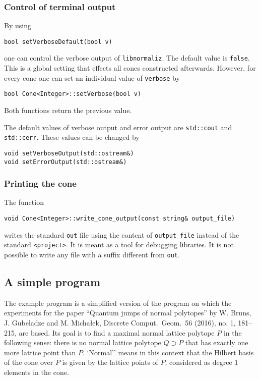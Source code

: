 \documentclass[12pt,a4paper]{scrartcl}
\theoremstyle{definition}
\begin{document}
\begin{small}
\subsubsection{Control of terminal output}
By using
\begin{Verbatim}
bool setVerboseDefault(bool v)
\end{Verbatim}
one can control the verbose output of \verb|libnormaliz|. The default value is \verb|false|. This is a global setting that effects all cones constructed afterwards. However, for every cone one can set an individual value of \verb|verbose| by
\begin{Verbatim}
bool Cone<Integer>::setVerbose(bool v)
\end{Verbatim}
Both functions return the previous value.

The default values of verbose output and error output are \verb|std::cout| and \verb|std::cerr|. These values can be changed by
\begin{Verbatim}
void setVerboseOutput(std::ostream&)
void setErrorOutput(std::ostream&)
\end{Verbatim}

\subsubsection{Printing  the cone}

The function
\begin{Verbatim}
void Cone<Integer>::write_cone_output(const string& output_file)
\end{Verbatim}

writes the standard \verb|out| file using the content of \verb|output_file| instead of the standard \verb|<project>|. It is meant as a tool for debugging libraries. It is not possible to write any file with a suffix different from \verb|out|.

\subsection{A simple program}\label{maxsimplex}

The example program is a simplified version of the program on which the experiments for the paper ``Quantum jumps of normal polytopes'' by  W. Bruns, J. Gubeladze and M. Micha\l{}ek, Discrete Comput.\ Geom.\ 56 (2016), no. 1, 181--215, are based. Its goal is to find a maximal normal lattice polytope $P$ in the following sense: there is no normal lattice polytope $Q\supset P$ that has exactly one more lattice point than $P$. `Normal'' means in this context that the Hilbert basis of the cone over $P$ is given by the lattice points of $P$, considered as degree $1$ elements in the cone. 


\end{small}
\end{document}
